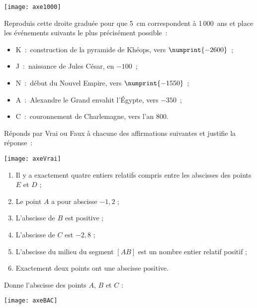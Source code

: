 \begin{exercice}[Histoires]
\begin{center} \texttt{[image: axe1000]} \end{center}
Reproduis cette droite graduée pour que 5 cm correspondent à 1\,000 ans et place les événements suivants le plus précisément possible :
\begin{itemize}
 \item K : construction de la pyramide de Khéops, vers $\numprint{-2600}$ ;
 \item J : naissance de Jules César, en $-100$ ;
 \item N : début du Nouvel Empire, vers $\numprint{-1550}$ ;
 \item A : Alexandre le Grand envahit l'Égypte, vers $-350$ ;
 \item C : couronnement de Charlemagne, vers l'an $800$.
 \end{itemize}
\end{exercice}


\begin{exercice}
Réponds par Vrai ou Faux à chacune des affirmations suivantes et justifie la réponse :
\begin{center} \texttt{[image: axeVrai]} \end{center}
\begin{enumerate}
 \item Il y a exactement quatre entiers relatifs compris entre les abscisses des points $E$ et $D$ ;
 \item Le point $A$ a pour abscisse $-1,2$ ;
 \item L'abscisse de $B$ est positive ;
 \item L'abscisse de $C$ est $-2,8$ ;
 \item L'abscisse du milieu du segment $[AB]$ est un nombre entier relatif positif ;
 \item Exactement deux points ont une abscisse positive.
 \end{enumerate}
\end{exercice}


\begin{exercice}
Donne l'abscisse des points $A$, $B$ et $C$ :
\begin{center} \texttt{[image: axeBAC]} \end{center}

\dotfill

\dotfill
\end{exercice}


